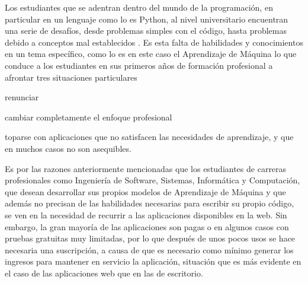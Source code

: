 Los estudiantes que se adentran dentro del mundo de la programación, en particular en un lenguaje como lo es Python, al nivel universitario encuentran una serie de desafíos, desde problemas simples con el código, hasta problemas debido a conceptos mal establecidos \parencite{Piwek2020}. Es esta falta de habilidades y conocimientos en un tema específico, como lo es en este caso el Aprendizaje de Máquina lo que conduce a los estudiantes en sus primeros años de formación profesional a afrontar tres situaciones particulares
\begin{seriate}
    \item renunciar
    \item cambiar completamente el enfoque profesional
    \item toparse con aplicaciones que no satisfacen las necesidades de aprendizaje, y que en muchos casos no son asequibles.
\end{seriate}
Es por las razones anteriormente mencionadas que los estudiantes de carreras profesionales como Ingeniería de Software, Sistemas, Informática y Computación, que desean desarrollar sus propios modelos de Aprendizaje de Máquina y que además no precisan de las habilidades necesarias para escribir su propio código, se ven en la necesidad de recurrir a las aplicaciones disponibles en la web. Sin embargo, la gran mayoría de las aplicaciones son pagas o en algunos casos con pruebas gratuitas muy limitadas, por lo que después de unos pocos usos se hace necesaria una suscripción, a causa de que es necesario como mínimo generar los ingresos para mantener en servicio la aplicación, situación que es más evidente en el caso de las aplicaciones web que en las de escritorio.


